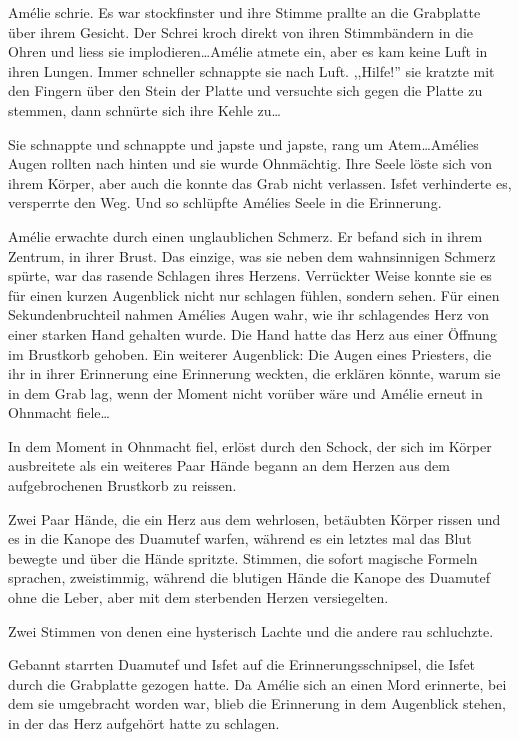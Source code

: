 Amélie schrie. Es war stockfinster und ihre Stimme prallte an die Grabplatte über ihrem Gesicht. Der Schrei kroch direkt von ihren Stimmbändern in die Ohren und liess sie implodieren\dots Amélie atmete ein, aber es kam keine Luft in ihren Lungen. Immer schneller schnappte sie nach Luft. ,,Hilfe!'' sie kratzte mit den Fingern über den Stein der Platte und versuchte sich gegen die Platte zu stemmen, dann schnürte sich ihre Kehle zu\dots

Sie schnappte und schnappte und japste und japste, rang um Atem\dots Amélies Augen rollten nach hinten und sie wurde Ohnmächtig. Ihre Seele löste sich von ihrem Körper, aber auch die konnte das Grab nicht verlassen. Isfet verhinderte es, versperrte den Weg. Und so schlüpfte Amélies Seele in die Erinnerung.

\sterne

Amélie erwachte durch einen unglaublichen Schmerz. Er befand sich in ihrem Zentrum, in ihrer Brust. Das einzige, was sie neben dem wahnsinnigen Schmerz spürte, war das rasende Schlagen ihres Herzens. Verrückter Weise konnte sie es für einen kurzen Augenblick nicht nur schlagen fühlen, sondern sehen. Für einen Sekundenbruchteil nahmen Amélies Augen wahr, wie ihr schlagendes Herz von einer starken Hand gehalten wurde. Die Hand hatte das Herz aus einer Öffnung im Brustkorb gehoben. Ein weiterer Augenblick: Die Augen eines Priesters, die ihr in ihrer Erinnerung eine Erinnerung weckten, die erklären könnte, warum sie in dem Grab lag, wenn der Moment nicht vorüber wäre und Amélie erneut in Ohnmacht fiele\dots

In dem Moment in Ohnmacht fiel, erlöst durch den Schock, der sich im Körper ausbreitete als ein weiteres Paar Hände begann an dem Herzen aus dem aufgebrochenen Brustkorb zu reissen.

Zwei Paar Hände, die ein Herz aus dem wehrlosen, betäubten Körper rissen und es in die Kanope des Duamutef warfen, während es ein letztes mal das Blut bewegte und über die Hände spritzte. Stimmen, die sofort magische Formeln sprachen, zweistimmig, während die blutigen Hände die Kanope des Duamutef ohne die Leber, aber mit dem sterbenden Herzen versiegelten. 

Zwei Stimmen von denen eine hysterisch Lachte und die andere rau schluchzte.

\sterne

Gebannt starrten Duamutef und Isfet auf die Erinnerungsschnipsel, die Isfet durch die Grabplatte gezogen hatte. Da Amélie sich an einen Mord erinnerte, bei dem sie umgebracht worden war, blieb die Erinnerung in dem Augenblick stehen, in der das Herz aufgehört hatte zu schlagen. 

